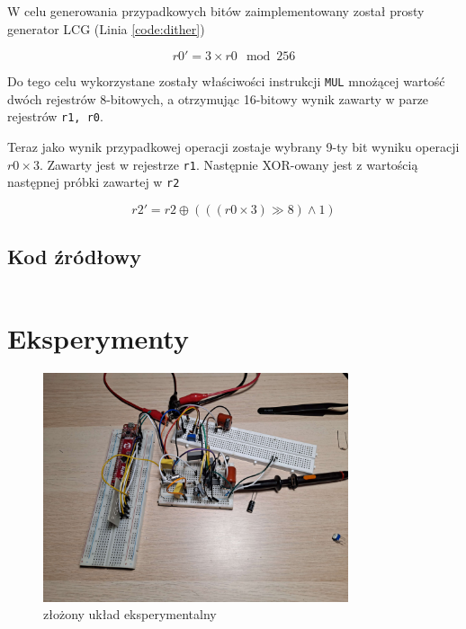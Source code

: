 \documentclass[12pt, a4paper]{article}
\begin{document}
W celu generowania przypadkowych bitów zaimplementowany został prosty generator LCG (Linia \ref{code:dither})

\begin{equation}
	r0'=3 \times r0 \mod 256
\end{equation}

Do tego celu wykorzystane zostały właściwości instrukcji \verb |MUL| mnożącej wartość dwóch rejestrów 8-bitowych,
a otrzymując 16-bitowy wynik zawarty w parze rejestrów \verb|r1, r0|.

Teraz jako wynik przypadkowej operacji zostaje wybrany 9-ty bit wyniku operacji $r0 \times 3$.
Zawarty jest w rejestrze \verb|r1|. Następnie XOR-owany jest z wartością następnej próbki zawartej w \verb|r2|

\begin{equation}
	r2' = r2 \oplus \left( \left( (r0 \times 3) \gg 8 \right) \land 1 \right)
\end{equation}
\fi

\subsection{Kod źródłowy}

\inputminted[linenos=true,escapeinside=@@,fontfamily=phv]{asm}{../code/src/main.S}

\section{Eksperymenty}
\begin{figure}[h]
	\centering
	\includegraphics[width=0.8\textwidth]{img/experimental_setup.jpg}
	\caption{złożony układ eksperymentalny}
	
\end{figure}
\end{document}

